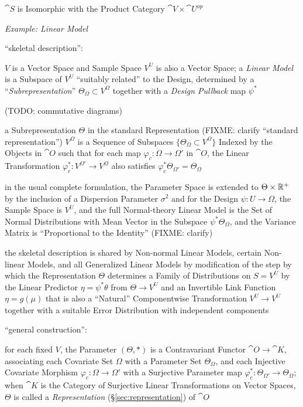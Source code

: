 $\cat{S}$ is Isomorphic with the Product Category $\cat{V} \times \cat{U}^{op}$

\emph{Example: Linear Model}

``skeletal description'':

$V$ is a Vector Space and Sample Space $V^U$ is also a Vector Space; a
\emph{Linear Model} is a Subspace of $V^U$ ``suitably related'' to the Design,
determined by a ``\emph{Subrepresentation}'' $\Theta_\Omega \subset V^{\Omega}$
together with a \emph{Design Pullback} map $\psi^*$

(TODO: commutative diagrams)

a Subrepresentation $\Theta$ in the standard Representation (FIXME: clarify
``standard representation'') $V^{\Omega}$ is a
Sequence of Subspaces $\{ \Theta_\Omega \subset V^\Omega \}$ Indexed by the
Objects in $\cat{O}$ such that for each map $\varphi_c : \Omega \to \Omega'$ in
$\cat{O}$, the Linear Transformation $\varphi_c^* : V^{\Omega'} \to V^\Omega$
also satisfies $\varphi_c^* \Theta_{\Omega'} = \Theta_\Omega$

in the usual complete formulation, the Parameter Space is extended to
$\Theta \times \mathbb{R}^+$ by the inclusion of a Dispersion Parameter $\sigma^2$
and for the Design $\psi : U \to \Omega$, the Sample Space is $V^U$, and the
full Normal-theory Linear Model is the Set of Normal Distributions with Mean
Vector in the Subspace $\psi^*\Theta_\Omega$, and the Variance Matrix is
``Proportional to the Identity'' (FIXME: clarify)

the skeletal description is shared by Non-normal Linear Models, certain
Non-linear Models, and all Generalized Linear Models by modification of the step
by which the Representation $\Theta$ determines a Family of Distributions on
$S = V^U$ by the Linear Predictor $\eta = \psi^*\theta$ from $\Theta \to V^U$
and an Invertible Link Function $\eta = g(\mu)$ that is also a ``Natural''
Componentwise Transformation $V^U \to V^U$ together with a suitable Error
Distribution with independent components

``general construction'':

for each fixed $V$, the Parameter $(\Theta, *)$ is a Contravariant Functor
$\cat{O} \to \cat{K}$, associating each Covariate Set $\Omega$ with a Parameter
Set $\Theta_\Omega$, and each Injective Covariate Morphism
$\varphi_c : \Omega \to \Omega'$ with a Surjective Parameter map
$\varphi_c^* : \Theta_{\Omega'} \to \Theta_\Omega$; when $\cat{K}$ is the
Category of Surjective Linear Transformations on Vector Spaces, $\Theta$ is
called a \emph{Representation} (\S\ref{sec:representation}) of $\cat{O}$

